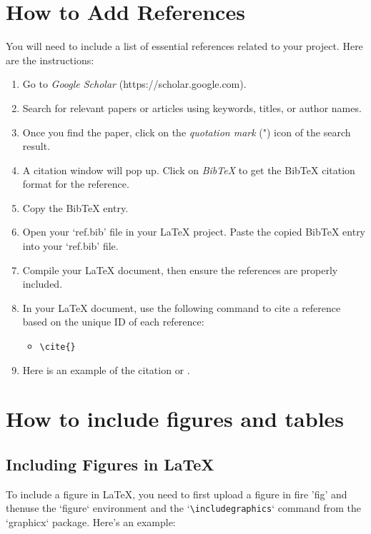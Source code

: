 \documentclass{article}
\begin{document}



\appendix

\section{How to Add References}
You will need to include a list of essential references related to your project. 
Here are the instructions:
\begin{enumerate}
    \item Go to \textit{Google Scholar} (https://scholar.google.com).
    \item Search for relevant papers or articles using keywords, titles, or author names.
    \item Once you find the paper, click on the \textit{quotation mark} (") icon of the search result.
    \item A citation window will pop up. Click on \textit{BibTeX} to get the BibTeX citation format for the reference.
    \item Copy the BibTeX entry.
    \item Open your `ref.bib' file in your LaTeX project. Paste the copied BibTeX entry into your `ref.bib' file.
    \item Compile your LaTeX document, then ensure the references are properly included.
    \item In your LaTeX document, use the following command to cite a reference based on the unique ID of each reference:
        \begin{itemize}
            \item \verb|\cite{}| 
        \end{itemize}
    \item Here is an example of the citation \cite{Examplecitation} or \cite{Examplecitation,gurulingappa2012extraction}.
\end{enumerate}

\section{How to include figures and tables}
\subsection{Including Figures in LaTeX}
To include a figure in LaTeX, you need to first upload a figure in  fire 'fig' and thenuse the `figure` environment and the `\verb|\includegraphics|` command from the `graphicx` package. Here's an example:
\end{document}
